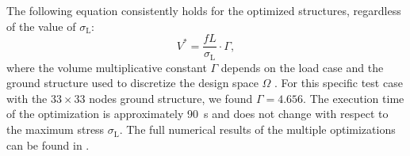 The following equation consistently holds for the optimized structures, regardless of the value of $\sigma_\text{L}$:
\begin{equation} \label{eq:03_V_star}
    V^*=\frac{fL}{\sigma_\text{L}}\cdot \Gamma,
\end{equation}
where the volume multiplicative constant $\Gamma$ depends on the load case and the ground structure used to discretize the design space $\Omega$ . For this specific test case with the $33 \times 33$ nodes ground structure, we found $\Gamma=4.656$. The execution time of the optimization is approximately \qty{90}{\second} and does not change with respect to the maximum stress $\sigma_\text{L}$. The full numerical results of the multiple optimizations can be found in .

